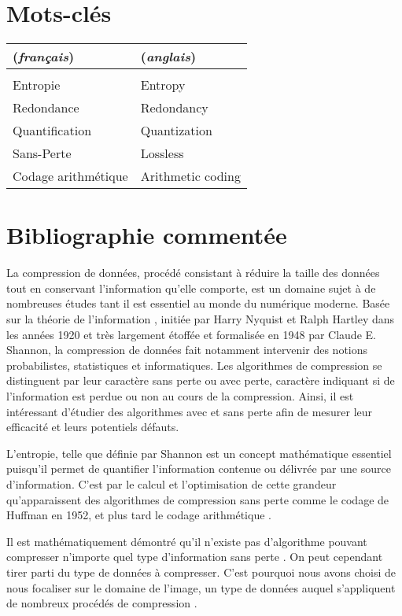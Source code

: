 \documentclass[a4paper, 11pt]{article}
\let\cite=\supercite
\begin{document}
\section*{Mots-cl\'es}

\begin{tabular}{l l} 
    (\textit{français}) & (\textit{anglais}) \\ \hline
     & \\
    Entropie & Entropy \\
    Redondance & Redondancy \\
    Quantification & Quantization \\
    Sans-Perte & Lossless \\
    Codage arithmétique & Arithmetic coding \\
    \end{tabular}

\section*{Bibliographie comment\'ee}

La compression de données, procédé consistant à réduire la taille des données tout en conservant l'information qu'elle comporte, est un domaine sujet à de nombreuses études tant il est essentiel au monde du numérique moderne. Basée sur la théorie de l'information \cite{entropy}, initiée par Harry Nyquist et Ralph Hartley dans les ann\'ees 1920 et très largement étoffée et formalisée en 1948 par Claude E. Shannon, la compression de données fait notamment intervenir des notions probabilistes, statistiques et informatiques. Les algorithmes de compression se distinguent par leur caractère sans perte ou avec perte, caractère indiquant si de l'information est perdue ou non au cours de la compression. Ainsi, il est intéressant d'étudier des algorithmes avec et sans perte afin de mesurer leur efficacité et leurs potentiels défauts.

L'entropie, telle que définie par Shannon \cite{entropy} est un concept mathématique essentiel puisqu'il permet de quantifier l'information contenue ou délivrée par une source d'information. C'est par le calcul et l'optimisation de cette grandeur qu'apparaissent des algorithmes de compression sans perte comme le codage de Huffman \cite{huffman} en 1952, et plus tard le codage arithmétique \cite{arithmetic-coding}.

Il est mathématiquement démontré qu'il n'existe pas d'algorithme pouvant compresser n'importe quel type d'information sans perte \cite{compression}. On peut cependant tirer parti du type de données à compresser. C'est pourquoi nous avons choisi de nous focaliser sur le domaine de l'image, un type de données auquel s'appliquent de nombreux procédés de compression \cite{compression} \cite{code-theory}.
\end{document}
